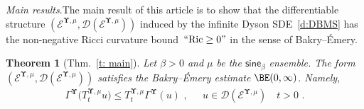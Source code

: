 \documentclass[11pt,letterpaper]{amsart}
\newcommand{\dom}[1]{\mathcal D(#1)}
\newcommand{\sem}[1]{\{#1\}_{t \ge 0}}
\let\temp\phi
\let\phi\varphi
\let\varphi\temp
\newcommand{\comma}{\,\,\mathrm{,}\;\,}
\newcommand{\fstop}{\,\,\mathrm{.}}
\newcommand{\cdc}{\Gamma}
\newcommand{\QP}{{\mu}}
\newcommand{\dUpsilon}{{\mathbf \Upsilon}}
\newcommand{\U}{\dUpsilon}
\newcommand{\sine}{\mathsf{sine}}
\newcommand{\E}{\mathcal E}
\renewcommand{\1}{\mathbf 1}
\numberwithin{equation}{section}
\theoremstyle{plain}
\newtheorem{thm}{Theorem}[section]
\theoremstyle{definition}
\theoremstyle{remark}
\renewcommand{\paragraph}[1]{\medskip\emph{#1}.\quad}
\begin{document}
\paragraph{Main results}The main result of this article is to show that the differentiable structure $(\E^{\U, \QP}, \dom{\E^{\U, \QP}})$ induced by the infinite Dyson SDE~\eqref{d:DBMS} has the non-negative Ricci curvature bound~$``{\rm Ric} \ge 0"$ in the sense of Bakry--\'Emery.
\begin{thm}[Thm.~\ref{t: main}] \label{t:intromain}
Let $\beta>0$ and $\QP$ be the $\sine_\beta$ ensemble.  The form~$(\E^{\U, \QP}, \dom{\E^{\U, \QP}})$ satisfies the Bakry--\'Emery estimate $\BE(0,\infty)$. Namely, %
\begin{align*}
\cdc^{\U}\bigl(T_t^{\U, \mu} u\bigr) \le T_t^{\U, \mu} \cdc^{\U}(u) \comma \quad u \in \dom{\E^{\U, \QP}}\quad t >0 \fstop
\end{align*} 
\end{thm}
\end{document}

